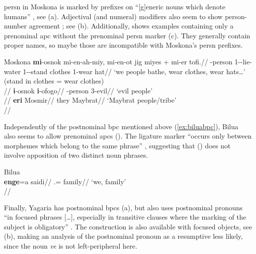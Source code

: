 \documentclass[A4paper]{article}
\newcommand{\lig}{\glossformat{lig}}		%
\begin{document}
\gls{persn} in Moskona is marked by prefixes on ``[g]eneric nouns which denote humans'' \citep[219]{gravelle2010}, see (\nextx a). Adjectival (and numeral) modifiers also seem to show person-number agreement \citep[127]{gravelle2010}; see (\nextx b). Additionally, \citet[224]{gravelle2010} shows examples containing only a prenominal \gls{apc} without the prenominal \gls{persn} marker (\nextx c). They generally contain proper names, so maybe those are incompatible with Moskona's \gls{persn} prefixes.

\pex Moskona
\a
\begingl
\gla \textbf{mi}-osnok mi-en-ah-miy,  mi-en-ot jig miyes + mi-er tofi.//
\Pl{}-person 1\Pl-\Dur{}-lie-water 1\Pl-\Dur{}-stand \Loc{} clothes 1\Pl{}-wear hat//
\glft `we people bathe, wear clothes, wear hats\ldots' (stand in clothes = wear clothes)\\
\citep[after][344, (2)]{gravelle2010}//
\endgl
\a \begingl
\gla \textbf{i}-osnok \textbf{i}-ofogo//
\Pl-person 3\Pl-evil//
\glft `evil people'\\
\citep[194, (26a)]{gravelle2010}//
\endgl
\a
\begingl
\gla \textbf{eri} Mosmir//
\glb they Maybrat//
\glft `Maybrat people/tribe'\\
\citep[224, (43b)]{gravelle2010}//
\endgl
\xe

Independently of the postnominal \gls{bpc} mentioned above (\ref{ex:biluabpc}), Bilua also seems to allow prenominal \glspl{apc} (\nextx). The ligature marker ``occurs only between morphemes which belong to the same phrase'' \citep[79]{obata2003}, suggesting that (\nextx) does not involve apposition of two distinct noun phrases.

\ex Bilua\label{ex:biluaPreAPC}\\
\begingl
\gla \textbf{enge}=a saidi//
\Pl{}.\Excl{}=\Lig{} family//
\glft `we, family'\\{\citep[79, (7.10)]{obata2003}}//
\endgl
\xe%

Finally, Yagaria has postnominal \glspl{bpc} (\nextx a), but also uses postnominal pronouns ``in focused phrases [\ldots], especially in transitive clauses where the marking of the subject is obligatory'' \citep[17]{renck1975}. The construction is also available with focused objects, see (\nextx b), making an analysis of the postnominal pronoun as a resumptive less likely, since the noun \emph{ve} is not left-peripheral here. %
\end{document}
